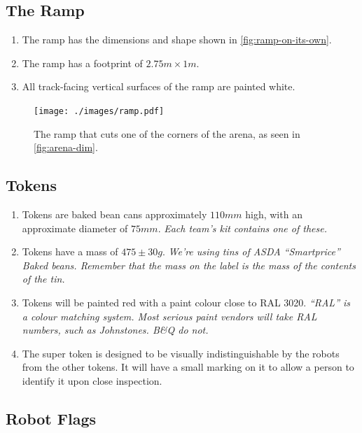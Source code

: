 \subsection{The Ramp}
\label{sub:Ramp}
\begin {enumerate}
\item The ramp has the dimensions and shape shown in \autoref{fig:ramp-on-its-own}.
\item The ramp has a footprint of $2.75m \times 1m$.
\item All track-facing vertical surfaces of the ramp are painted white.
\end {enumerate}

\begin{figure}
  \begin{center}
    \texttt{[image: ./images/ramp.pdf]}
  \end{center}
  \caption{\label{fig:ramp-on-its-own}The ramp that cuts one of the corners of the arena, as seen in \autoref{fig:arena-dim}.}
\end{figure}

\subsection{Tokens}
\label{sub:Tokens}
\begin {enumerate}
\item Tokens are baked bean cans approximately $110mm$ high, with an approximate diameter of $75mm$.
\emph{Each team's kit contains one of these.}
\item Tokens have a mass of $475\pm30g$.  \emph{We're using tins of ASDA ``Smartprice'' Baked beans.  Remember that the mass on the label is the mass of the contents of the tin.}
\item Tokens will be painted red with a paint colour close to RAL 3020.  \emph{``RAL'' is  a colour matching system.  Most serious paint vendors will take RAL numbers, such as Johnstones.  B\&Q do not.}

\item The super token is designed to be visually indistinguishable by the robots from the other tokens.  It will have a small marking on it to allow a person to identify it upon close inspection.
\end {enumerate}

\subsection{Robot Flags}
\label{sub:Flags}

